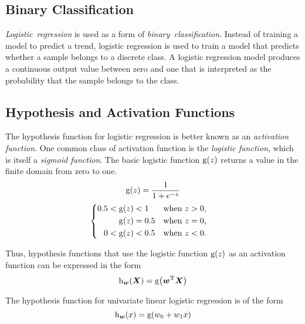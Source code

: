 \subsection{Binary Classification}

\emph{Logistic~regression} is used as a form of \emph{binary~classification}.
Instead of training a model to predict a trend, logistic regression is used to train a model that predicts whether a sample belongs to a discrete class.
A logistic regression model produces a continuous output value between zero and one that is interpreted as the probability that the sample belongs to the class.

\subsection{Hypothesis and Activation Functions}

The hypothesis function for logistic regression is better known as an \emph{activation function}.
One common class of activation function is the \emph{logistic function}, which is itself a \emph{sigmoid function}.
The basic logistic function \( \function{g}{z} \) returns a value in the finite domain from zero to one.
\begin{equation*}
  \function{g}{z} = \frac{1}{1 + e^{-z}}
\end{equation*}
\begin{equation*}
  \begin{cases}
    \begin{aligned}
      0.5 < \function{g}{z} &< 1 & \text{when } z &> 0 \text{,} \\
      \function{g}{z} &= 0.5 & \text{when } z &= 0 \text{,} \\
      0 < \function{g}{z} &< 0.5 & \text{when } z &< 0 \text{.}
    \end{aligned}
  \end{cases}
\end{equation*}

Thus, hypothesis functions that use the logistic function \( \function{g}{z} \) as an activation function can be expressed in the form
\begin{equation*}
  \function[_{\boldsymbol{w}}]{h}{\boldsymbol{X}} = \function{g}{\boldsymbol{w}^{\mathrm{T}} \boldsymbol{X}}
\end{equation*}

The hypothesis function for univariate linear logistic regression is of the form
\begin{equation*}
  \function[_{\boldsymbol{w}}]{h}{x} = \function{g}{w_{0} + w_{1} x}
\end{equation*}

